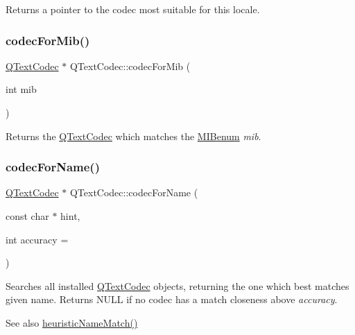 Returns a pointer to the codec most suitable for this locale. \mbox{\label{class_q_text_codec_a4706a5d4023d048cc1c655dfa2b16e68}} 
\subsubsection{\texorpdfstring{codecForMib()}{codecForMib()}}
{\footnotesize\ttfamily \mbox{\hyperlink{class_q_text_codec}{Q\+Text\+Codec}} $\ast$ Q\+Text\+Codec\+::codec\+For\+Mib (\begin{DoxyParamCaption}\item[{int}]{mib }\end{DoxyParamCaption})\hspace{0.3cm}{\ttfamily [static]}}

Returns the \mbox{\hyperlink{class_q_text_codec}{Q\+Text\+Codec}} which matches the \mbox{\hyperlink{class_q_text_codec_aa0118daa4f82235ae9d5bb70a168c992}{M\+I\+Benum}} {\itshape mib}. \mbox{\label{class_q_text_codec_ade1d10ad04ecafc6d7ec54ba91ba7841}} 
\subsubsection{\texorpdfstring{codecForName()}{codecForName()}}
{\footnotesize\ttfamily \mbox{\hyperlink{class_q_text_codec}{Q\+Text\+Codec}} $\ast$ Q\+Text\+Codec\+::codec\+For\+Name (\begin{DoxyParamCaption}\item[{const char $\ast$}]{hint,  }\item[{int}]{accuracy = {} }\end{DoxyParamCaption})\hspace{0.3cm}{\ttfamily [static]}}

Searches all installed \mbox{\hyperlink{class_q_text_codec}{Q\+Text\+Codec}} objects, returning the one which best matches given name. Returns N\+U\+LL if no codec has a match closeness above {\itshape accuracy}.

\begin{DoxySeeAlso}{See also}
\mbox{\hyperlink{class_q_text_codec_a1bcf2f11fac6113fd6ae74dda55b2ca4}{heuristic\+Name\+Match()}} 
\end{DoxySeeAlso}
\mbox{\label{class_q_text_codec_a4c333273ed9037228a03e8f3a850f431}} 
